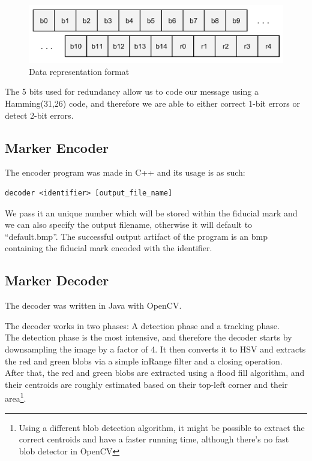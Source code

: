\documentclass[DIV=calc, paper=a4, fontsize=11pt, twocolumn]{scrartcl}   %
\begin{document}
\begin{figure}[!h]
    \centering
    \includegraphics[width=0.9\columnwidth]{bits.pdf}
    \caption{Data representation format}
    \label{fig:bits}
\end{figure}

The 5 bits used for redundancy allow us to code our message using a Hamming(31,26) code, and therefore we are able to either correct 1-bit errors or detect 2-bit errors.

\subsection*{Marker Encoder}

The encoder program was made in C++ and its usage is as such:
\begin{verbatim}
decoder <identifier> [output_file_name]
\end{verbatim}


We pass it an unique number which will be stored within the fiducial mark and we can also specify the output filename, otherwise it will default to ``default.bmp''. The successful output artifact of the program is an bmp containing the fiducial mark encoded with the identifier.

\subsection*{Marker Decoder}
The decoder was written in Java with OpenCV.

The decoder works in two phases: A detection phase and a tracking phase.\\


The detection phase is the most intensive, and therefore the decoder starts by downsampling the image by a factor of 4. It then converts it to HSV and extracts the red and green blobs via a simple inRange filter and a closing operation.\\


After that, the red and green blobs are extracted using a flood fill algorithm, and their centroids are roughly estimated based on their top-left corner and their area\footnote{Using a different blob detection algorithm, it might be possible to extract the correct centroids and have a faster running time, although there's no fast blob detector in OpenCV}.
\end{document}

